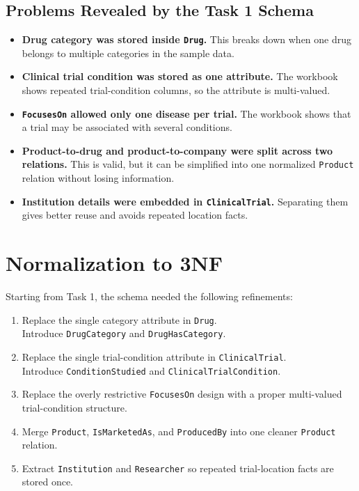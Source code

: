 \documentclass[12pt,a4paper]{article}
\begin{document}
\subsection{Problems Revealed by the Task 1 Schema}
\begin{itemize}[leftmargin=1.5em]
    \item \textbf{Drug category was stored inside \texttt{Drug}.} This breaks down when one drug belongs to multiple categories in the sample data.
    \item \textbf{Clinical trial condition was stored as one attribute.} The workbook shows repeated trial-condition columns, so the attribute is multi-valued.
    \item \textbf{\texttt{FocusesOn} allowed only one disease per trial.} The workbook shows that a trial may be associated with several conditions.
    \item \textbf{Product-to-drug and product-to-company were split across two relations.} This is valid, but it can be simplified into one normalized \texttt{Product} relation without losing information.
    \item \textbf{Institution details were embedded in \texttt{ClinicalTrial}.} Separating them gives better reuse and avoids repeated location facts.
\end{itemize}

\section{Normalization to 3NF}
Starting from Task 1, the schema needed the following refinements:

\begin{enumerate}[leftmargin=1.5em]
    \item Replace the single category attribute in \texttt{Drug}.\\
    Introduce \texttt{DrugCategory} and \texttt{DrugHasCategory}.
    \item Replace the single trial-condition attribute in \texttt{ClinicalTrial}.\\
    Introduce \texttt{ConditionStudied} and \texttt{ClinicalTrialCondition}.
    \item Replace the overly restrictive \texttt{FocusesOn} design with a proper multi-valued trial-condition structure.
    \item Merge \texttt{Product}, \texttt{IsMarketedAs}, and \texttt{ProducedBy} into one cleaner \texttt{Product} relation.
    \item Extract \texttt{Institution} and \texttt{Researcher} so repeated trial-location facts are stored once.
\end{enumerate}
\end{document}
